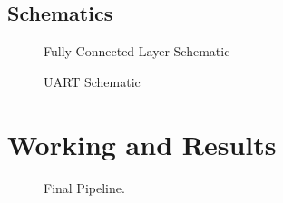 \documentclass{article}
\begin{document}
\subsection{Schematics} 
        \begin{figure}[!hbt]
                \noindent{}
                \caption{Fully Connected Layer Schematic }
            \end{figure}
        \begin{figure}[!hbt]
        \noindent{}
        \caption{UART Schematic}
    \end{figure}
    


\section{Working and Results}

\begin{figure}[!hbt]
        \noindent{}
        \caption{Final Pipeline.}
\end{figure}
\end{document}
